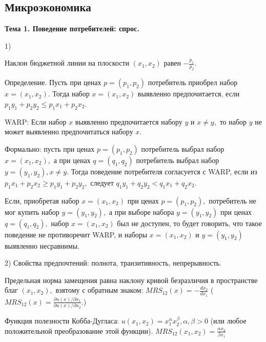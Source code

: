 \documentclass[a4paper,8pt]{article} %
\begin{document}
	

\subsection*{Микроэкономика}

\textbf{Тема 1. Поведение потребителей:
спрос.}

1)

Наклон бюджетной линии на плоскости
$\left(x_{1}, x_{2}\right)$ равен $-\frac{p_{1}}{p_{2}} .$

Определение.
Пусть при ценах $p=\left(p_{1}, p_{2}\right)$ потребитель приобрел набор $x=\left(x_{1}, x_{2}\right) .$ Тогда набор $x=\left(x_{1}, x_{2}\right)$ 
выявленно предпочитается,  если 
$p_{1} y_{1}+p_{2} y_{2} \leq p_{1} x_{1}+p_{2} x_{2} .$

WARP: Если набор $x$ выявленно предпочитается набору $y$ и $x \neq y,$ то набор $y$ не может выявленно предпочитаться набору $x$.

Формально: пусть при ценах $p=\left(p_{1}, p_{2}\right)$ потребитель выбрал набор $x=\left(x_{1}, x_{2}\right),$ а при ценах $q=\left(q_{1}, q_{2}\right)$ потребитель выбрал набор $y=\left(y_{1}, y_{2}\right), x \neq y .$ Тогда поведение потребителя
согласуется с WARP, если из $p_{1} x_{1}+p_{2} x_{2} \geq p_{1} y_{1}+p_{2} y_{2},$ следует $q_{1} y_{1}+q_{2} y_{2}<q_{1} x_{1}+q_{2} x_{2} . $

Если, приобретая набор $x=\left(x_{1}, x_{2}\right)$ при ценах $p=\left(p_{1}, p_{2}\right),$ потребитель не мог купить набор
$y=\left(y_{1}, y_{2}\right),$ а при выборе набора $y=\left(y_{1}, y_{2}\right)$ при ценах $q=\left(q_{1}, q_{2}\right),$ набор $x=\left(x_{1}, x_{2}\right)$ был не
доступен, то будет говорить, что такое поведение не противоречит WARP, и наборы $x=\left(x_{1}, x_{2}\right)$
и $y=\left(y_{1}, y_{2}\right)$ выявленно несравнимы.

2) Свойства предпочтений: полнота, транзитивность, непрерывность. 

Предельная норма замещения равна наклону кривой безразличия в пространстве благ $\left(x_{1}, x_{2}\right),$ взятому с обратным знаком: $M R S_{12}(x)=-\frac{d x_{2}}{d x_{1}}$ ($M R S_{12}(x)=\frac{\partial u(x) / \partial x_{1}}{\partial u(x) / \partial x_{2}}$.)

Функция полезности Кобба-Дугласа: $u\left(x_{1}, x_{2}\right)=x_{1}^{\alpha} x_{2}^{\beta}, \alpha, \beta>0$ (или любое положительной преобразование этой функции).  $M R S_{12}\left(x_{1}, x_{2}\right)=\frac{\alpha x_{2}}{\beta x_{1}}$
\end{document}
